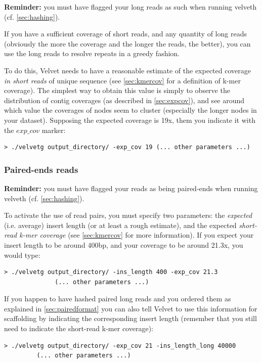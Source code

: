 \documentclass{article}
\begin{document}
\textbf{Reminder:} you must have flagged your long reads as such when running
velveth (cf. \ref{sec:hashing}).
	
If you have a sufficient coverage of short reads, and any quantity of long reads (obviously the more the coverage and the longer the reads, the better), you can use the long reads to resolve repeats in a greedy fashion. 

To do this, Velvet needs to have a reasonable estimate of the expected coverage \emph{in short reads} of unique sequence (see \ref{sec:kmercov} for a definition of k-mer coverage). The simplest way to obtain this value is simply to observe the distribution of contig coverages (as described in \ref{sec:expcov}), and see around which value the coverages of nodes seem to cluster (especially the longer nodes in your dataset). Supposing the expected coverage is 19x, them you indicate it with the $exp\_cov$ marker:

\begin{verbatim}
> ./velvetg output_directory/ -exp_cov 19 (... other parameters ...)
\end{verbatim}

	\subsubsection{Paired-ends reads}

\textbf{Reminder:} you must have flagged your reads as being paired-ends when running
velveth (cf. \ref{sec:hashing}).

To activate the use of read pairs, you must specify two parameters: the \emph{expected} (i.e. average)
insert length (or at least a rough estimate), and the expected \emph{short-read k-mer coverage} (see \ref{sec:kmercov} for more information). If you expect your insert length to be around 400bp, and your coverage to be around 21.3x, you would type:

\begin{verbatim}
> ./velvetg output_directory/ -ins_length 400 -exp_cov 21.3 
	          (... other parameters ...)
\end{verbatim}

If you happen to have hashed paired long reads and you ordered them as explained in \ref{sec:pairedformat} you can also tell Velvet to use this information for scaffolding by indicating the corresponding insert length (remember that you still need to indicate the short-read k-mer coverage):

\begin{verbatim}
> ./velvetg output_directory/ -exp_cov 21 -ins_length_long 40000 
		 (... other parameters ...)
\end{verbatim}
\end{document}
